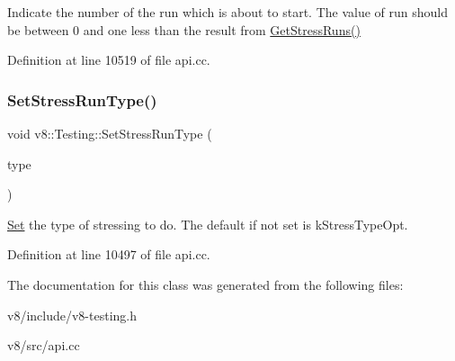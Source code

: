 Indicate the number of the run which is about to start. The value of run should be between 0 and one less than the result from \mbox{\hyperlink{classv8_1_1Testing_a85ab1c8e52fa31fabbf7c44096cdd070}{Get\+Stress\+Runs()}} 

Definition at line 10519 of file api.\+cc.

\mbox{\label{classv8_1_1Testing_ae77a4350f86d915ffa3dacc30f07d74b}} 
\subsubsection{\texorpdfstring{Set\+Stress\+Run\+Type()}{SetStressRunType()}}
{\footnotesize\ttfamily void v8\+::\+Testing\+::\+Set\+Stress\+Run\+Type (\begin{DoxyParamCaption}\item[{Testing\+::\+Stress\+Type}]{type }\end{DoxyParamCaption})\hspace{0.3cm}{\ttfamily [static]}}

\mbox{\hyperlink{classv8_1_1Set}{Set}} the type of stressing to do. The default if not set is k\+Stress\+Type\+Opt. 

Definition at line 10497 of file api.\+cc.



The documentation for this class was generated from the following files\+:\begin{DoxyCompactItemize}
\item 
v8/include/v8-\/testing.\+h\item 
v8/src/api.\+cc\end{DoxyCompactItemize}
